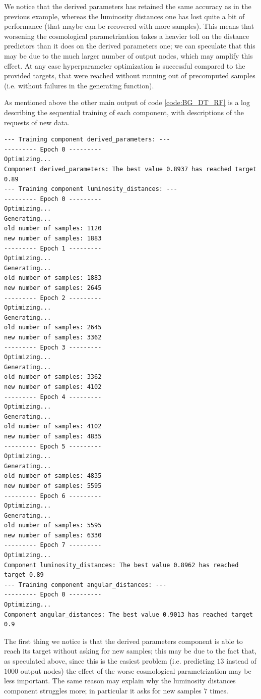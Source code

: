 We notice that the derived parameters has retained the same accuracy as in the previous example, whereas the luminosity distances one has lost quite a bit of performance (that maybe can be recovered with more samples). This means that worsening the cosmological parametrization takes a heavier toll on the distance predictors than it does on the derived parameters one; we can speculate that this may be due to the much larger number of output nodes, which may amplify this effect.
At any case hyperparameter optimization is successful compared to the provided targets, that were reached without running out of precomputed samples (i.e. without failures in the generating function).

As mentioned above the other main output of code \ref{code:BG_DT_RF} is a log describing the sequential training of each component, with descriptions of the requests of new data.
\begin{verbatim}
--- Training component derived_parameters: ---
--------- Epoch 0 ---------
Optimizing...
Component derived_parameters: The best value 0.8937 has reached target 0.89
--- Training component luminosity_distances: ---
--------- Epoch 0 ---------
Optimizing...
Generating...
old number of samples: 1120
new number of samples: 1883
--------- Epoch 1 ---------
Optimizing...
Generating...
old number of samples: 1883
new number of samples: 2645
--------- Epoch 2 ---------
Optimizing...
Generating...
old number of samples: 2645
new number of samples: 3362
--------- Epoch 3 ---------
Optimizing...
Generating...
old number of samples: 3362
new number of samples: 4102
--------- Epoch 4 ---------
Optimizing...
Generating...
old number of samples: 4102
new number of samples: 4835
--------- Epoch 5 ---------
Optimizing...
Generating...
old number of samples: 4835
new number of samples: 5595
--------- Epoch 6 ---------
Optimizing...
Generating...
old number of samples: 5595
new number of samples: 6330
--------- Epoch 7 ---------
Optimizing...
Component luminosity_distances: The best value 0.8962 has reached target 0.89
--- Training component angular_distances: ---
--------- Epoch 0 ---------
Optimizing...
Component angular_distances: The best value 0.9013 has reached target 0.9
\end{verbatim}
The first thing we notice is that the derived parameters component is able to reach its target without asking for new samples; this may be due to the fact that, as speculated above, since this is the easiest problem (i.e. predicting $13$ instead of $1000$ output nodes) the effect of the worse cosmological parametrization may be less important. The same reason may explain why the luminosity distances component struggles more; in particular it asks for new samples $7$ times.

